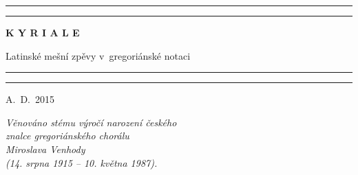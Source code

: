 \documentclass[12pt]{article} %
\begin{document}
\begin{titlepage}
  \begin{center}

    { \vspace*{35 mm} }
    \rule{0.8\textwidth}{1pt}\par
    \vspace{2pt}\vspace{-\baselineskip}
    \rule{0.8\textwidth}{0.4pt}\par
    \vspace{20 mm}

    \begin{Huge}\textbf{K Y R I A L E}\end{Huge}

    \vspace{30 mm}
    \begin{Large}{Latinské mešní zpěvy v~gregoriánské notaci}\end{Large}

    \vspace{20 mm}
    \rule{0.8\textwidth}{0.4pt}\par
    \vspace{2pt}\vspace{-\baselineskip}
    \rule{0.8\textwidth}{1pt}\par

    \vspace{90 mm}
    \begin{large}{A.~D.~2015}\end{large}

  \end{center}
\end{titlepage}


\newpage
\thispagestyle{empty}
\mbox{}
    \vspace{90 mm}
\begin{center}
  \begin{large}
    {\it Věnováno stému výročí narození českého\\
         znalce gregoriánského chorálu\\
	 Miroslava Venhody\\
	 (14. srpna 1915 -- 10. května 1987).
    }
  \end{large}
\end{center}
\setcounter{page}{0}



\end{document}
